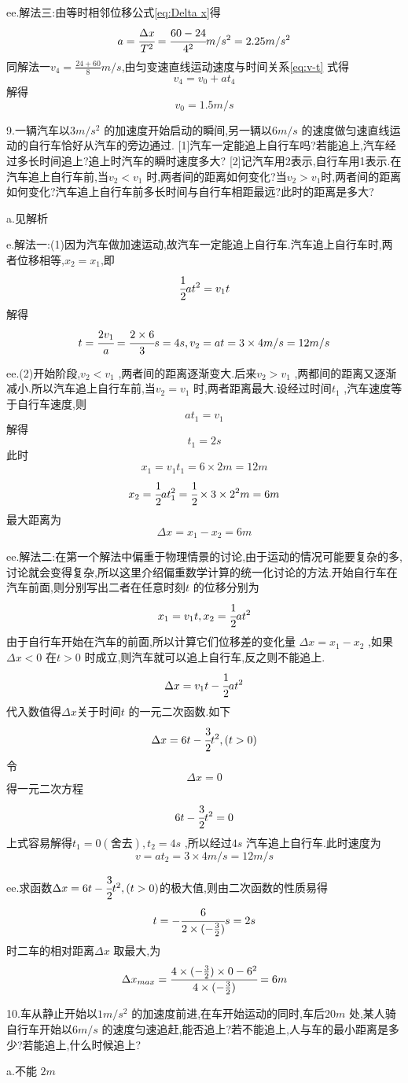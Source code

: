 \begin{calculate}
ee.解法三:由等时相邻位移公式\eqref{eq:Delta x}得
$$a=\cfrac{\Delta x}{T^2}=\cfrac{60-24}{4^2}m/s^2=2.25m/s^2$$
同解法一$v_4=\frac{24+60}{8}m/s$,由匀变速直线运动速度与时间关系\eqref{eq:v-t} 式得
$$v_4=v_0+at_4$$
解得
$$v_0=1.5m/s$$

9.一辆汽车以$3m/s^2$ 的加速度开始启动的瞬间,另一辆以$6m/s$ 的速度做匀速直线运动的自行车恰好从汽车的旁边通过.
[1]汽车一定能追上自行车吗?若能追上,汽车经过多长时间追上?追上时汽车的瞬时速度多大?
[2]记汽车用2表示,自行车用1表示.在汽车追上自行车前,当$v_2<v_1$ 时,两者间的距离如何变化?当$v_2>v_1$时,两者间的距离如何变化?汽车追上自行车前多长时间与自行车相距最远?此时的距离是多大?

a.见解析

e.解法一:(1)因为汽车做加速运动,故汽车一定能追上自行车.汽车追上自行车时,两者位移相等,$x_2=x_1$,即
$$\cfrac{1}{2}at^2=v_1t$$
解得
$$t=\cfrac{2v_1}{a}=\cfrac{2\times6}{3}s=4s,v_2=at=3\times 4 m/s=12m/s$$

ee.(2)开始阶段,$v_2<v_1$ ,两者间的距离逐渐变大.后来$v_2>v_1$ ,两都间的距离又逐渐减小.所以汽车追上自行车前,当$v_2=v_1$ 时,两者距离最大.设经过时间$t_1$ ,汽车速度等于自行车速度,则
$$at_1=v_1$$
解得
$$t_1=2s$$
此时
$$x_1=v_1t_1=6\times2m=12m$$
$$x_2=\cfrac{1}{2}at_1^2=\cfrac{1}{2}\times3\times2^2m=6m$$
最大距离为
$$\Delta x=x_1-x_2=6m$$

ee.解法二:在第一个解法中偏重于物理情景的讨论,由于运动的情况可能要复杂的多,讨论就会变得复杂,所以这里介绍偏重数学计算的统一化讨论的方法.开始自行车在汽车前面,则分别写出二者在任意时刻$t$ 的位移分别为
$$x_1=v_1t , x_2=\cfrac{1}{2}at^2$$
由于自行车开始在汽车的前面,所以计算它们位移差的变化量 $\Delta x=x_1-x_2$ ,如果$\Delta x <0 $ 在$t>0$ 时成立,则汽车就可以追上自行车,反之则不能追上.
$$\Delta x=v_1t-\cfrac{1}{2}at^2$$
代入数值得$\Delta x $关于时间$t$ 的一元二次函数.如下
$$\Delta x=6t-\cfrac{3}{2}t^2, (t>0)$$
令$$\Delta x =0 $$ 得一元二次方程
$$6t-\cfrac{3}{2}t^2=0$$
上式容易解得$t_1=0 (\mbox{舍去}),t_2=4s$ ,所以经过$4s$ 汽车追上自行车.此时速度为
$$v=at_2=3\times 4 m/s=12m/s$$

ee.求函数$\Delta x=6t-\cfrac{3}{2}t^2, (t>0)$的极大值,则由二次函数的性质易得
$$t=-\cfrac{6}{2\times(-\frac{3}{2})}s=2s$$
时二车的相对距离$\Delta x$ 取最大,为
$$\Delta x_{max}=\cfrac{4\times(-\frac{3}{2})\times 0 - 6^2}{4\times(-\frac{3}{2})}=6m$$


10.车从静止开始以$1m/s^2$ 的加速度前进,在车开始运动的同时,车后$20m$ 处,某人骑自行车开始以$ 6m/s$ 的速度匀速追赶,能否追上?若不能追上,人与车的最小距离是多少?若能追上,什么时候追上?

a.不能 $2m$


\end{calculate}
